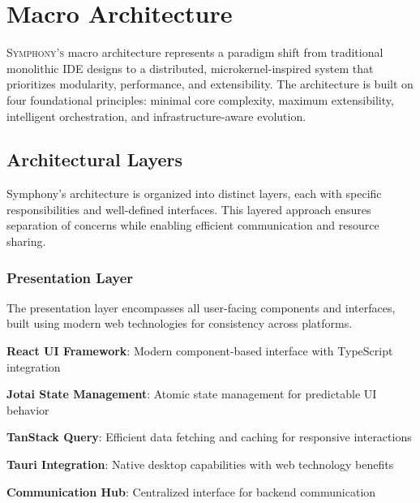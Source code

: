 
\section*{Macro Architecture}

\lettrine{S}{ymphony's} macro architecture represents a paradigm shift from traditional monolithic IDE designs to a distributed, microkernel-inspired system that prioritizes modularity, performance, and extensibility. The architecture is built on four foundational principles: minimal core complexity, maximum extensibility, intelligent orchestration, and infrastructure-aware evolution.

\subsection*{Architectural Layers}

Symphony's architecture is organized into distinct layers, each with specific responsibilities and well-defined interfaces. This layered approach ensures separation of concerns while enabling efficient communication and resource sharing.

\subsubsection*{Presentation Layer}

The presentation layer encompasses all user-facing components and interfaces, built using modern web technologies for consistency across platforms.

\begin{compactlist}
    \item \textbf{React UI Framework}: Modern component-based interface with TypeScript integration
    \item \textbf{Jotai State Management}: Atomic state management for predictable UI behavior
    \item \textbf{TanStack Query}: Efficient data fetching and caching for responsive interactions
    \item \textbf{Tauri Integration}: Native desktop capabilities with web technology benefits
    \item \textbf{Communication Hub}: Centralized interface for backend communication
\end{compactlist}

